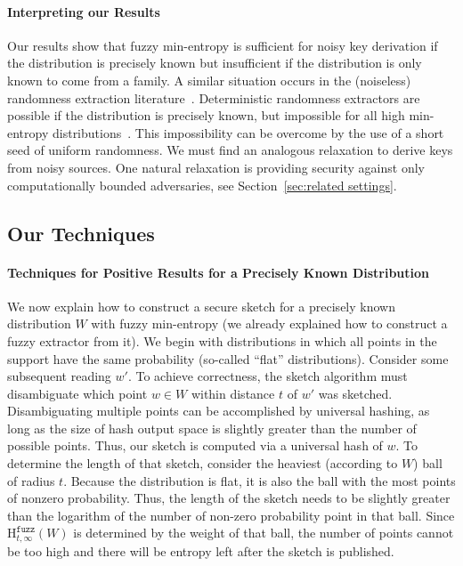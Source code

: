 \documentclass[11pt]{article}
\newcommand{\secref}[1]{\mbox{Section~\ref{#1}}}
\newcommand{\Hfuzz}{\mathrm{H}^{\mathtt{fuzz}}_{t,\infty}}
\begin{document}
\paragraph{Interpreting our Results}
Our results show that fuzzy min-entropy is sufficient for noisy key derivation if the distribution is precisely known but insufficient if the distribution is only known to come from a family.  A similar situation occurs in the (noiseless) randomness extraction literature~\cite{nisan1993randomness}.  Deterministic randomness extractors are possible if the distribution is precisely known, but impossible for all high min-entropy distributions~\cite{santha1986generating}.  This impossibility can be overcome by the use of a short seed of uniform randomness.  
We must find an analogous relaxation to derive keys from noisy sources.  One natural relaxation is providing security against only  computationally bounded adversaries, see \secref{sec:related settings}.

\subsection{Our Techniques}

\paragraph{Techniques for Positive Results for a Precisely Known Distribution} We now explain how to construct a secure sketch for a precisely known distribution $W$ with fuzzy min-entropy (we already explained how to construct a fuzzy extractor from it).  We begin with distributions in which all points in the support have the same probability (so-called ``flat'' distributions).   Consider some subsequent reading $w'$. To achieve correctness, the sketch algorithm must disambiguate which point $w\in W$ within distance $t$ of $w'$ was sketched. Disambiguating multiple points can be accomplished by universal hashing, as long as the size of hash output space is slightly greater than the number of possible points. Thus, our sketch is computed via a universal hash of $w$. To determine the length of that sketch, consider the heaviest (according to $W$) ball of radius $t$. Because the distribution is flat, it is also the ball with the most points of nonzero probability. Thus, the length of the sketch needs to be slightly greater than the logarithm of the number of non-zero probability point in that ball. Since $\Hfuzz(W)$ is determined by the weight of that ball, the number of points cannot be too high and there will be entropy left after the sketch is published.
\end{document}
